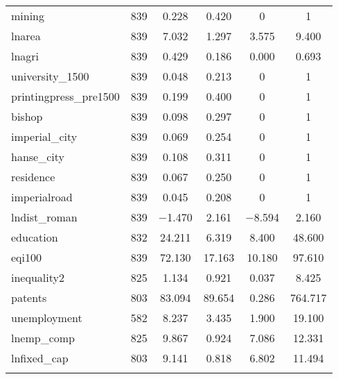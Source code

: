 \begin{table}[!htbp]
\begin{tabular}{@{\extracolsep{5pt}}lccccc}
mining & 839 & 0.228 & 0.420 & 0 & 1 \\ 
lnarea & 839 & 7.032 & 1.297 & 3.575 & 9.400 \\ 
lnagri & 839 & 0.429 & 0.186 & 0.000 & 0.693 \\ 
university\_1500 & 839 & 0.048 & 0.213 & 0 & 1 \\ 
printingpress\_pre1500 & 839 & 0.199 & 0.400 & 0 & 1 \\ 
bishop & 839 & 0.098 & 0.297 & 0 & 1 \\ 
imperial\_city & 839 & 0.069 & 0.254 & 0 & 1 \\ 
hanse\_city & 839 & 0.108 & 0.311 & 0 & 1 \\ 
residence & 839 & 0.067 & 0.250 & 0 & 1 \\ 
imperialroad & 839 & 0.045 & 0.208 & 0 & 1 \\ 
lndist\_roman & 839 & $-$1.470 & 2.161 & $-$8.594 & 2.160 \\ 
education & 832 & 24.211 & 6.319 & 8.400 & 48.600 \\ 
eqi100 & 839 & 72.130 & 17.163 & 10.180 & 97.610 \\ 
inequality2 & 825 & 1.134 & 0.921 & 0.037 & 8.425 \\ 
patents & 803 & 83.094 & 89.654 & 0.286 & 764.717 \\ 
unemployment & 582 & 8.237 & 3.435 & 1.900 & 19.100 \\ 
lnemp\_comp & 825 & 9.867 & 0.924 & 7.086 & 12.331 \\ 
lnfixed\_cap & 803 & 9.141 & 0.818 & 6.802 & 11.494 \\ 
\hline \\[-1.8ex] 
\end{tabular} 
\end{table} 
